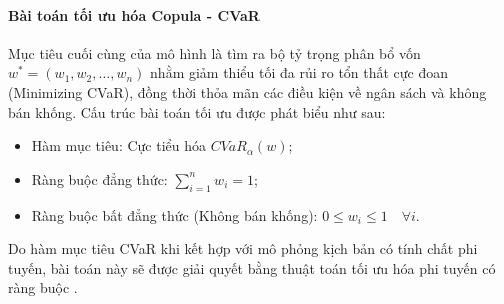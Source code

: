 \paragraph{Bài toán tối ưu hóa Copula - CVaR}

Mục tiêu cuối cùng của mô hình là tìm ra bộ tỷ trọng phân bổ vốn $w^* = (w_1, w_2, \dots, w_n)$ nhằm giảm thiểu tối đa rủi ro tổn thất cực đoan (Minimizing CVaR), đồng thời thỏa mãn các điều kiện về ngân sách và không bán khống. Cấu trúc bài toán tối ưu được phát biểu như sau:

\begin{itemize}
    \item Hàm mục tiêu: Cực tiểu hóa $CVaR_{\alpha}(w)$;
    \item Ràng buộc đẳng thức: $\sum_{i=1}^{n} w_i = 1$;
    \item Ràng buộc bất đẳng thức (Không bán khống): $0 \le w_i \le 1 \quad \forall i$.
\end{itemize}

Do hàm mục tiêu CVaR khi kết hợp với mô phỏng kịch bản có tính chất phi tuyến, bài toán này sẽ được giải quyết bằng thuật toán tối ưu hóa phi tuyến có ràng buộc \cite{rockafellar2000optimization}.